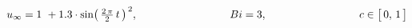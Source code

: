 $u _{\infty}  = 1\ + 1.3\cdot\sin\bigl(\,\frac{2\,\pi}{2}\,t\,\bigr)^{\,2}, \hspace{30mm} Bi=3, \hspace{30mm} c \in \big[ \, 0, \, 1 \, \big]$
